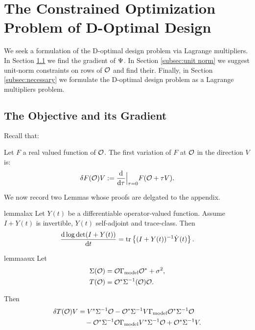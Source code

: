 \section{The Constrained Optimization Problem of D-Optimal Design}\label{section:D and grad}
We seek a formulation of the D-optimal design problem
\cite{AlexanderianGloorGhattas14} via Lagrange multipliers. In Section
\ref{section:objective} we find the gradient of $\Psi$. In Section
\ref{subsec:unit norm} we suggest unit-norm constraints on rows of
$\mathcal{O}$ and find their. Finally, in Section \ref{subsec:necessary} we
formulate the D-optimal design problem as a Lagrange multipliers
problem.


\subsection{The Objective and its Gradient}\label{section:objective}
Recall that:


\begin{definition}\label{def:var}
  Let $F$ a real valued function of $\mathcal{O}$. The first variation of $F$
  at $\mathcal{O}$ in the direction $V$ is:
  \begin{equation*}
    \delta F(\obs) V := \frac{\der}{\der \tau}\Big |_{\tau=0}  F( \obs + \tau V).
  \end{equation*}
\end{definition}

We now record two Lemmas whose proofs are delgated to the appendix.

\begin{restatable*}{lemma}{lax}\label{lemma:lax}
  Let $Y(t)$ be a differentiable operator-valued function. Assume 
  $I+Y(t)$ is invertible, $Y(t)$ self-adjoint and trace-class. Then
  \begin{equation*}
    \frac{\der \log \det (I+Y(t))}{\der t} = \tr{(I+Y(t))^{-1} \dot{Y}(t)}.
  \end{equation*}
\end{restatable*}

\begin{restatable*}{lemma}{aux}\label{lemma:aux calc}
  Let
  \begin{align*}
    \begin{split}
      \Sigma(\obs) &= \obs\modcov\obs^* + \sigma^2, \\
      T(\obs) &= \obs^* \Sigma^{-1}(\obs)\obs.
    \end{split}
  \end{align*}

  Then
  \begin{align*}
    \delta T(\obs)V &= V^* \Sigma^{-1} \obs 
    - \obs^*\Sigma^{-1} V\modcov \obs^* \Sigma^{-1}\obs \\
    &\ \ \ - \obs^* \Sigma^{-1} \obs \modcov V^* \Sigma^{-1}\obs
    + \obs^* \Sigma^{-1} V.
  \end{align*}
\end{restatable*}

